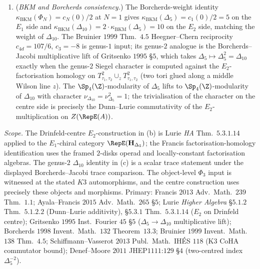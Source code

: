 \begin{proposition}
\begin{enumerate}[label=(\alph*),leftmargin=1.6em]
 doubling $\Delta_5\mapsto\Delta_5^2=\Delta_{10}$ is the scalar
 shadow of the passage from the $E_1$ boundary algebra to its
 centre-side \(E_2\) trace. The factor of two is the
 two-centred-black-hole Denef--Moore duplication of
 Proposition~\ref{prop:hochcalc-msw-kinematic-hdelta5-left-mover}(iv),
 categorified by the trace comparison: the scalar $Z^X(q,t,p)=C/\Delta_5^2$
 is read as the centre-side genus-$2$ trace only after the displayed
 Borcherds--Jacobi trace map has been fixed.
 \item (\emph{BKM and Borcherds consistency.}) The Borcherds-weight
 identity $\kappa_{\mathrm{BKM}}(\Phi_N)=c_N(0)/2$ at $N=1$ gives
 $\kappa_{\mathrm{BKM}}(\Delta_5)=c_1(0)/2=5$ on the $E_1$ side and
 $\kappa_{\mathrm{BKM}}(\Delta_{10})=2\cdot\kappa_{\mathrm{BKM}}(\Delta_5)=10$
 on the $E_2$ side, matching the weight of $\Delta_{10}$. The
 Bruinier $1999$ Thm.\ $4.5$ Heegner--Chern reciprocity
$c_{4d}=107/6$, $c_3=-8$ is genus-$1$
 input; its genus-$2$ analogue is the Borcherds--Jacobi
 multiplicative lift of Gritsenko $1995$ \S$5$, which takes
 $\Delta_5\mapsto\Delta_5^2=\Delta_{10}$ exactly when the genus-$2$
 Siegel character is computed against the $E_2$-factorisation
 homology on $T^2_{\tau_1,\tau_2}\cup_{z}T^2_{\tau_1,\tau_2}$ (two
 tori glued along a middle Wilson line $z$). The $\Sp_4(\Z)$-modularity
 of $\Delta_5$ lifts to $\Sp_4(\Z)$-modularity of $\Delta_{10}$
 with character $\nu_{\Delta_{10}}=\nu_{\Delta_5}^2=1$; the
 trivialisation of the character on the centre side is precisely the
 Dunn--Lurie commutativity of the $E_2$-multiplication on
 $Z(\RepE(A))$.
\end{enumerate}
\emph{Scope.} The Drinfeld-centre $E_2$-construction in (b) is Lurie
\emph{HA} Thm.\ $5.3.1.14$ applied to the $E_1$-chiral category
$\RepE(\mathbf H_{\Delta_5})$; the Francis factorisation-homology
identification uses the framed $2$-disks operad and locally-constant
factorisation algebras. The genus-$2$ $\Delta_{10}$ identity in (c)
is a scalar trace statement under the displayed Borcherds--Jacobi trace
 comparison. The object-level $\Phi_3$ input is witnessed at the stated
$K3$ automorphisms, and the centre construction uses precisely these
objects and morphisms.
Primary: Francis $2013$ Adv.\ Math.\ $239$ Thm.\ $1.1$;
Ayala--Francis $2015$ Adv.\ Math.\ $265$ \S$5$;
Lurie \emph{Higher Algebra} \S$5.1.2$ Thm.\ $5.1.2.2$ (Dunn--Lurie
additivity), \S$5.3.1$ Thm.\ $5.3.1.14$ ($E_2$ on Drinfeld centre);
Gritsenko $1995$ Inst.\ Fourier $45$ \S$5$ ($\Delta_5\to\Delta_{10}$
multiplicative lift);
Borcherds $1998$ Invent.\ Math.\ $132$ Theorem~$13.3$;
Bruinier $1999$ Invent.\ Math.\ $138$ Thm.\ $4.5$;
Schiffmann--Vasserot $2013$ Publ.\ Math.\ IH\'ES $118$ (K3 CoHA
commutator bound);
Denef--Moore $2011$ JHEP$1111$:$129$ \S$4$ (two-centred index
$\Delta_5^{-2}$).
\end{proposition}

